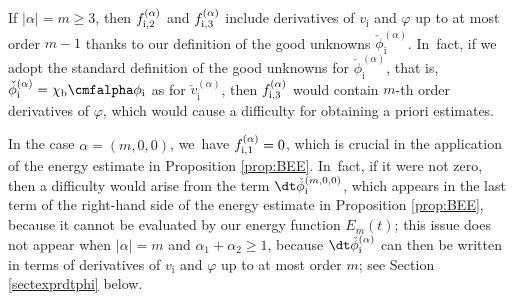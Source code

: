\skpt
\begin{remark}\label{re:GU2}
\begin{enumeratei}
\item\label{re:GU2i}
If $|\alpha|=m\geq3$, then $f_{{\rm i},2}^{(\alpha)}$ and $f_{{\rm i},3}^{(\alpha)}$ include derivatives of $v_\mathrm{i}$ and $\varphi$ up to at most order $m-1$
thanks to our definition of the good unknowns $\check{\phi}_\mathrm{i}^{(\alpha)}$. In~fact, if we adopt the standard definition of the good unknowns for
$\check{\phi}_\mathrm{i}^{(\alpha)}$, that is, $\check{\phi}_\mathrm{i}^{(\alpha)}=\chi_\mathrm{b}\cmfalpha\phi_\mathrm{i}$ as for $\check{v}_\mathrm{i}^{(\alpha)}$,
then $f_{{\rm i},3}^{(\alpha)}$ would contain $m$-th order derivatives of $\varphi$, which would cause a difficulty for obtaining a priori estimates.

\item\label{re:GU2ii}
In the case $\alpha=(m,0,0)$, we~have $f_{{\rm i},1}^{(\alpha)}=0$, which is crucial in the application of the energy estimate in Proposition \ref{prop:BEE}. In~fact, if it were not zero, then a difficulty would arise from the term $\dt\check{\phi}_\mathrm{i}^{(m,0,0)}$,
which appears in the last term of the right-hand side of the energy estimate in Proposition \ref{prop:BEE},
because it cannot be evaluated by our energy function $E_m(t)$;
this issue does not appear when $|\alpha|=m$ and $\alpha_1+\alpha_2\geq1$,
because $\dt\check{\phi}_\mathrm{i}^{(\alpha)}$ can then be written in terms of derivatives of $v_\mathrm{i}$ and $\varphi$ up to at most order $m$;
see Section \ref{sectexprdtphi} below.
\end{enumeratei}
\end{remark}

